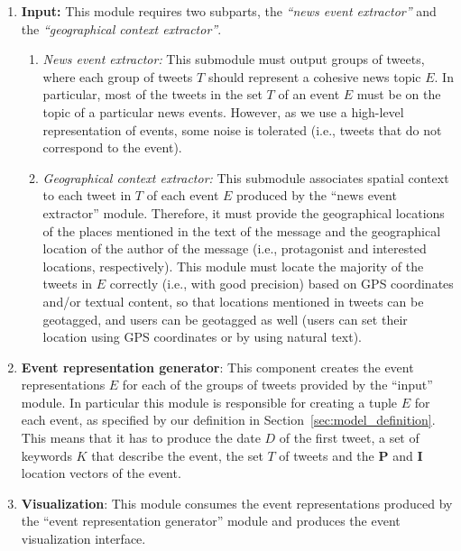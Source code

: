 
\begin{enumerate}

\item{\bf Input:} 
%
This module requires two subparts, the {\em ``news event extractor''} and the
{\em ``geographical context extractor''}.
%
    \begin{enumerate}
    \item{\em News event extractor:} 
    This submodule must output groups of tweets, where each group of tweets $T$
    should represent a cohesive news topic $E$.  
    In particular, most of the tweets in the set $T$ of an event $E$ must be on
    the topic of a particular news events. 
    However, as we use a high-level representation of events, some noise is
    tolerated (i.e., tweets that do not correspond to the event).

    \item{\em Geographical context extractor:} 
    This submodule associates spatial context to each tweet in $T$ of each event
    $E$ produced by the ``news event extractor'' module. 
    Therefore, it must provide the geographical locations of the places
    mentioned in the text of the message and the geographical location of the
    author of the message (i.e., protagonist and interested locations,
    respectively). 
    This module must locate the majority of the tweets in $E$ correctly (i.e.,
    with good precision) based on GPS coordinates and/or textual content, so
    that locations mentioned in tweets can be geotagged, and users can be
    geotagged as well (users can set their location using GPS coordinates or by
    using natural text).

    \end{enumerate}
%
\item{\bf Event representation generator}: 
%
This component creates the event representations $E$ for each of the groups of
tweets provided by the ``input'' module. 
%
In particular this module is responsible for creating a tuple $E$ for each
event, as specified by our definition in Section~\ref{sec:model_definition}.
%
This means that it has to produce the date $D$ of the first tweet, a set of
keywords $K$ that describe the event, the set $T$ of tweets and the $\mathbf{P}$
and $\mathbf{I}$ location vectors of the event.


\item{\bf Visualization}: 
%
This module consumes the event representations
produced by the ``event representation generator'' module and produces the event
visualization interface.

\end{enumerate}



